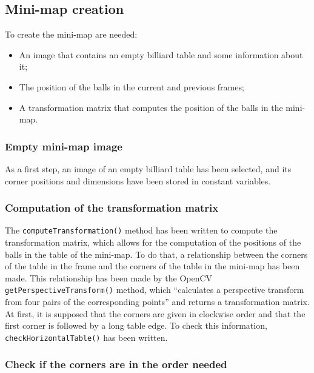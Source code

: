 \subsection{Mini-map creation}

To create the mini-map are needed:
\begin{itemize}
	\item An image that contains an empty billiard table and some information about it;
	\item The position of the balls in the current and previous frames;
	\item A transformation matrix that computes the position of the balls in the mini-map.
\end{itemize}

\subsubsection{Empty mini-map image}

As a first step, an image of an empty billiard table has been selected, and its corner positions and dimensions have been stored in constant variables.

\subsubsection{Computation of the transformation matrix}

The \texttt{computeTransformation()} method has been written to compute the transformation matrix, which allows for the computation of the positions of the balls in the table of the mini-map. To do that, a relationship between the corners of the table in the frame and the corners of the table in the mini-map has been made. This relationship has been made by the OpenCV \texttt{getPerspectiveTransform()} method, which “calculates a perspective transform from four pairs of the corresponding points” and returns a transformation matrix. At first, it is supposed that the corners are given in clockwise order and that the first corner is followed by a long table edge. To check this information, \texttt{checkHorizontalTable()} has been written. 

\subsubsection{Check if the corners are in the order needed}

